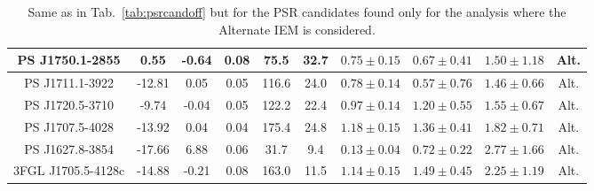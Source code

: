 \begin{table*}
\begin{tabular}{|c|c|c|c|c|c|c|c|c|c|}
\hline 
 PS J1750.1-2855 & 0.55 & -0.64 & 0.08 & 75.5 & 32.7 & $0.75\pm0.15$ & $0.67\pm0.41$ & $1.50\pm1.18$ & Alt. \\
\hline 
 PS J1711.1-3922 & -12.81 & 0.05 & 0.05 & 116.6 & 24.0 & $0.78\pm0.14$ & $0.57\pm0.76$ & $1.46\pm0.66$ & Alt. \\
\hline 
 PS J1720.5-3710 & -9.74 & -0.04 & 0.05 & 122.2 & 22.4 & $0.97\pm0.14$ & $1.20\pm0.55$ & $1.55\pm0.67$ & Alt. \\
\hline 
 PS J1707.5-4028 & -13.92 & 0.04 & 0.04 & 175.4 & 24.8 & $1.18\pm0.15$ & $1.36\pm0.41$ & $1.82\pm0.71$ & Alt. \\
\hline 
 PS J1627.8-3854 & -17.66 & 6.88 & 0.06 & 31.7 & 9.4 & $0.13\pm0.04$ & $0.72\pm0.22$ & $2.77\pm1.66$ & Alt. \\
\hline 
 3FGL J1705.5-4128c & -14.88 & -0.21 & 0.08 & 163.0 & 11.5 & $1.14\pm0.15$ & $1.49\pm0.45$ & $2.25\pm1.19$ & Alt. \\
\hline 
\hline 
\end{tabular}
\caption{Same as in Tab.~\ref{tab:psrcandoff} but for the PSR candidates found only for the analysis where the Alternate IEM is considered.}
\label{tab:psrcandref1}
\end{table*}




